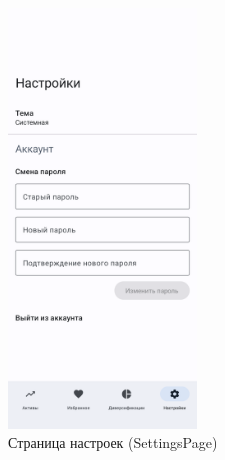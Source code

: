 \documentclass[a4paper, 14pt]{article}
\begin{document}
\begin{figure}[H]
    \centering
    \includegraphics[width=5cm]{resources/13.png}
    \caption{Страница настроек (SettingsPage)}
\end{figure}
\end{document}
